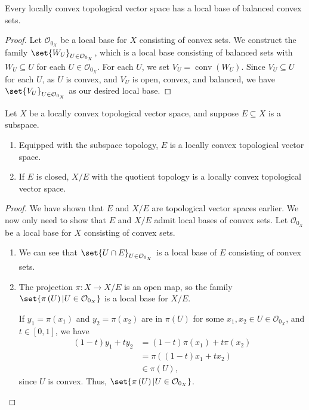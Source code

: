 \documentclass[10pt]{mypackage}
\DeclareMathOperator{\conv}{conv}
\begin{document}
\begin{proposition}
  Every locally convex topological vector space has a local base of balanced convex sets.
\end{proposition}
\begin{proof}
  Let $\mathcal{O}_{0_X}$ be a local base for $X$ consisting of convex sets. We construct the family $\set{W_{U}}_{U\in \mathcal{O}_{0_X}}$, which is a local base consisting of balanced sets with $W_{U}\subseteq U$ for each $U\in \mathcal{O}_{0_X}$. For each $U$, we set $V_{U} = \conv\left(W_{U}\right)$. Since $V_{U}\subseteq U$ for each $U$, as $U$ is convex, and $V_{U}$ is open, convex, and balanced, we have $\set{V_{U}}_{U\in \mathcal{O}_{0_X}}$ as our desired local base.
\end{proof}
\begin{proposition}
  Let $X$ be a locally convex topological vector space, and suppose $E\subseteq X$ is a subspace.
  \begin{enumerate}[(1)]
    \item Equipped with the subspace topology, $E$ is a locally convex topological vector space.
    \item If $E$ is closed, $X/E$ with the quotient topology is a locally convex topological vector space.
  \end{enumerate}
\end{proposition}
\begin{proof}
  We have shown that $E$ and $X/E$ are topological vector spaces earlier. We now only need to show that $E$ and $X/E$ admit local bases of convex sets. Let $\mathcal{O}_{0_X}$ be a local base for $X$ consisting of convex sets.
  \begin{enumerate}[(1)]
    \item We can see that $\set{U\cap E}_{U\in \mathcal{O}_{0_X}}$ is a local base of $E$ consisting of convex sets.
    \item The projection $\pi: X\rightarrow X/E$ is an open map, so the family $\set{\pi\left(U\right)| U\in \mathcal{O}_{0_X}}$ is a local base for $X/E$.\newline

      If $y_1 = \pi\left(x_1\right)$ and $y_2 = \pi\left(x_2\right)$ are in $\pi(U)$ for some $x_1,x_2\in U\in \mathcal{O}_{0_X}$, and $t\in [0,1]$, we have
      \begin{align*}
        \left(1-t\right)y_1 + ty_2 &= \left(1-t\right)\pi\left(x_1\right) + t\pi\left(x_2\right)\\
                                   &= \pi\left(\left(1-t\right)x_1 + tx_2\right)\\
                                   &\in \pi(U),
      \end{align*}
      since $U$ is convex. Thus, $\set{\pi\left(U\right)| U\in \mathcal{O}_{0_X}}$.
  \end{enumerate}
\end{proof}
\end{document}
